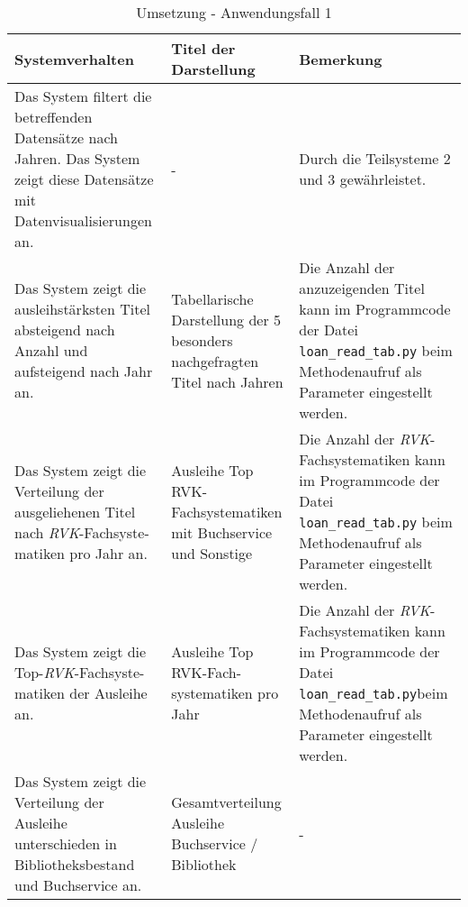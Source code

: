 \begingroup
    \setlength{\tabcolsep}{12pt} %
    \renewcommand{\arraystretch}{1.5} 
    \begin{table}[h]
        \Large
        \centering
        \begin{adjustbox}{max width=\textwidth}
        \begin{tabular}{p{}p{}p{}}
           \toprule
           Systemverhalten        &Titel der Darstellung&Bemerkung\\
           \midrule
           Das System filtert die betreffenden Datensätze nach Jahren. Das System zeigt diese Datensätze mit Datenvisualisierungen an.&-&Durch die Teilsysteme 2  und 3 gewährleistet.\\
           Das System zeigt die ausleihstärksten Titel absteigend nach Anzahl und aufsteigend nach Jahr an.&Tabellarische Darstellung der 5 besonders nachgefragten Titel nach Jahren&Die Anzahl der anzuzeigenden Titel kann im Programmcode der Datei \texttt{loan\_read\_tab.py} beim Methodenaufruf als Parameter eingestellt werden.\\
           Das System zeigt die Verteilung der ausgeliehenen Titel nach \textit{\acrshort{RVK}}-Fachsyste-matiken pro Jahr an.&Ausleihe Top RVK-Fachsystematiken mit Buchservice und Sonstige&Die Anzahl der \textit{\acrshort{RVK}}-Fachsystematiken kann im Programmcode der Datei \texttt{loan\_read\_tab.py} beim Methodenaufruf als Parameter eingestellt werden.\\
           Das System zeigt die Top-\textit{\acrshort{RVK}}-Fachsyste-matiken der Ausleihe an.&Ausleihe Top RVK-Fach-systematiken pro Jahr\footnotemark&Die Anzahl der \textit{\acrshort{RVK}}-Fachsystematiken kann im Programmcode der Datei \texttt{loan\_read\_tab.py}beim Methodenaufruf als Parameter eingestellt werden.\\
           Das System zeigt die Verteilung der Ausleihe unterschieden in Bibliotheksbestand und Buchservice an.&Gesamtverteilung Ausleihe Buchservice / Bibliothek&-\\
        \bottomrule
        \end{tabular}
        \end{adjustbox}
        \caption{%
            Umsetzung - Anwendungsfall 1
        }
        \label{tab:Anwendungsfall 1 - Umgesetzte Anforderungen}
        \end{table}


